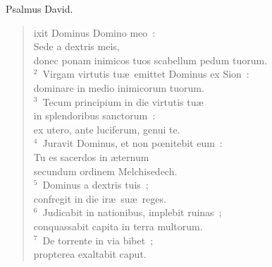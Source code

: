 \bchapter[Psalm]
Psalmus David. \begin{verse}ixit Dominus Domino meo~:\\ Sede a dextris meis,\\ donec ponam inimicos tuos scabellum pedum tuorum.\\
${}^{2}$~Virgam virtutis tu\ae\ emittet Dominus ex Sion~:\\ dominare in medio inimicorum tuorum.\\
${}^{3}$~Tecum principium in die virtutis tu\ae \\ in splendoribus sanctorum~:\\ ex utero, ante luciferum, genui te.\\
${}^{4}$~Juravit Dominus, et non pœnitebit eum~:\\ Tu es sacerdos in \ae ternum\\ secundum ordinem Melchisedech.\\
${}^{5}$~Dominus a dextris tuis~;\\ confregit in die ir\ae\ su\ae\ reges.\\
${}^{6}$~Judicabit in nationibus, implebit ruinas~;\\ conquassabit capita in terra multorum.\\
${}^{7}$~De torrente in via bibet~;\\ propterea exaltabit caput.\end{verse}



